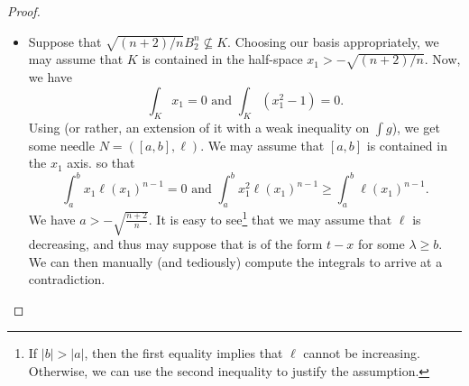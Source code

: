 \begin{proof}
	\phantom{agh}
	\begin{itemize}
		\item Suppose that $\sqrt{(n+2)/n}B_2^n\not\subseteq K$. Choosing our basis appropriately, we may assume that $K$ is contained in the half-space $x_1 > -\sqrt{(n+2)/n}$. Now, we have
		\[ \int_K x_1 = 0 \text{ and } \int_K (x_1^2 - 1) = 0. \]
		Using  (or rather, an extension of it with a weak inequality on $\int g$), we get some needle $N=([a,b],\ell)$. We may assume that $[a,b]$ is contained in the $x_1$ axis. so that
		\[ \int_a^b x_1\ell(x_1)^{n-1} = 0 \text{ and } \int_a^b x_1^2\ell(x_1)^{n-1} \geq \int_a^b \ell(x_1)^{n-1}. \]
		We have $a > -\sqrt{\frac{n+2}{n}}$. It is easy to see\footnote{If $|b|>|a|$, then the first equality implies that $\ell$ cannot be increasing. Otherwise, we can use the second inequality to justify the assumption.} that we may assume that $\ell$ is decreasing, and thus may suppose that is of the form $t-x$ for some $\lambda\geq b$. We can then manually (and tediously) compute the integrals to arrive at a contradiction.


\end{itemize}
\end{proof}
